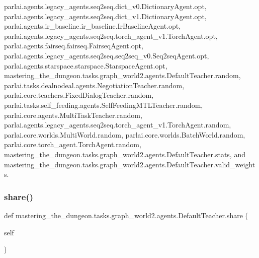 parlai.\+agents.\+legacy\+\_\+agents.\+seq2seq.\+dict\+\_\+v0.\+Dictionary\+Agent.\+opt, parlai.\+agents.\+legacy\+\_\+agents.\+seq2seq.\+dict\+\_\+v1.\+Dictionary\+Agent.\+opt, parlai.\+agents.\+ir\+\_\+baseline.\+ir\+\_\+baseline.\+Ir\+Baseline\+Agent.\+opt, parlai.\+agents.\+legacy\+\_\+agents.\+seq2seq.\+torch\+\_\+agent\+\_\+v1.\+Torch\+Agent.\+opt, parlai.\+agents.\+fairseq.\+fairseq.\+Fairseq\+Agent.\+opt, parlai.\+agents.\+legacy\+\_\+agents.\+seq2seq.\+seq2seq\+\_\+v0.\+Seq2seq\+Agent.\+opt, parlai.\+agents.\+starspace.\+starspace.\+Starspace\+Agent.\+opt, mastering\+\_\+the\+\_\+dungeon.\+tasks.\+graph\+\_\+world2.\+agents.\+Default\+Teacher.\+random, parlai.\+tasks.\+dealnodeal.\+agents.\+Negotiation\+Teacher.\+random, parlai.\+core.\+teachers.\+Fixed\+Dialog\+Teacher.\+random, parlai.\+tasks.\+self\+\_\+feeding.\+agents.\+Self\+Feeding\+M\+T\+L\+Teacher.\+random, parlai.\+core.\+agents.\+Multi\+Task\+Teacher.\+random, parlai.\+agents.\+legacy\+\_\+agents.\+seq2seq.\+torch\+\_\+agent\+\_\+v1.\+Torch\+Agent.\+random, parlai.\+core.\+worlds.\+Multi\+World.\+random, parlai.\+core.\+worlds.\+Batch\+World.\+random, parlai.\+core.\+torch\+\_\+agent.\+Torch\+Agent.\+random, mastering\+\_\+the\+\_\+dungeon.\+tasks.\+graph\+\_\+world2.\+agents.\+Default\+Teacher.\+stats, and mastering\+\_\+the\+\_\+dungeon.\+tasks.\+graph\+\_\+world2.\+agents.\+Default\+Teacher.\+valid\+\_\+weights.

\mbox{\label{classmastering__the__dungeon_1_1tasks_1_1graph__world2_1_1agents_1_1DefaultTeacher_a39e2feb7177317317f6071f5ac53f392}} 
\subsubsection{\texorpdfstring{share()}{share()}}
{\footnotesize\ttfamily def mastering\+\_\+the\+\_\+dungeon.\+tasks.\+graph\+\_\+world2.\+agents.\+Default\+Teacher.\+share (\begin{DoxyParamCaption}\item[{}]{self }\end{DoxyParamCaption})}



